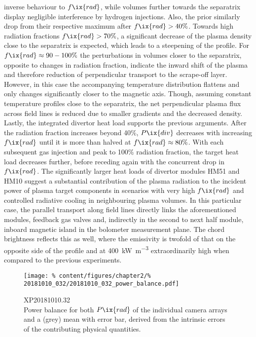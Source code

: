 inverse behaviour to $f\ix{rad}$, while volumes further towards the separatrix display negligible interference by hydrogen injections. Also, the prior similarly drop from their respective maximum after $f\ix{rad}>40\%$. Towards high radiation fractions $f\ix{rad}>70\%$, a significant decrease of the plasma density close to the separatrix is expected, which leads to a steepening of the profile. For $f\ix{rad}\approx90-100\%$ the perturbations in volumes closer to the separatrix, opposite to changes in radiation fraction, indicate the inward shift of the plasma and therefore reduction of perpendicular transport to the scrape-off layer. However, in this case the accompanying temperature distribution flattens and only changes significantly closer to the magnetic axis. Though, assuming constant temperature profiles close to the separatrix, the net perpendicular plasma flux across field lines is reduced due to smaller gradients and the decreased density. Lastly, the integrated divertor heat load supports the previous arguments. After the radiation fraction increases beyond 40\%, $P\ix{div}$ decreases with increasing $f\ix{rad}$ until it is more than halved at $f\ix{rad}\approx80\%$. With each subsequent gas injection and peak to 100\% radiation fraction, the target heat load decreases further, before receding again with the concurrent drop in $f\ix{rad}$. The significantly larger heat loads of divertor modules HM51 and HM10 suggest a substantial contribution of the plasma radiation to the incident power of plasma target components in scenarios with very high $f\ix{rad}$ and controlled radiative cooling in neighbouring plasma volumes. In this particular case, the parallel transport along field lines directly links the aforementioned modules, feedback gas valves and, indirectly in the second to next half module, inboard magnetic island in the bolometer measurement plane. The chord brightness reflects this as well, where the emissivity is twofold of that on the opposite side of the profile and at \SI{400}{\kilo\watt\per\cubic\meter} extraordinarily high when compared to the previous experiments.\\%
%
            \begin{figure}[t]%
                \centering%
                \texttt{[image: \%
                    content/figures/chapter2/\%
                    20181010\_032/20181010\_032\_power\_balance.pdf]}%
                \caption{XP20181010.32\\%
                    Power balance for both $P\ix{rad}$ of the individual camera arrays and a (grey) mean with error bar, derived from the intrinsic errors of the contributing physical quantities.}\label{fig:20181010.32_balance}%
            \end{figure}%
